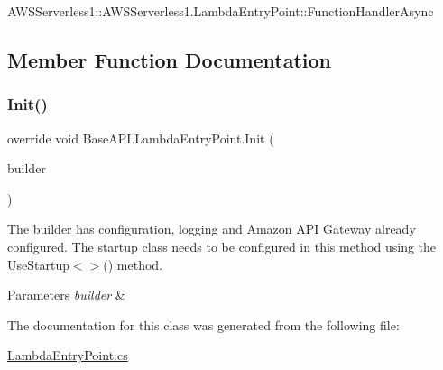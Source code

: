 A\+W\+S\+Serverless1\+::\+A\+W\+S\+Serverless1.\+Lambda\+Entry\+Point\+::\+Function\+Handler\+Async 

\subsection{Member Function Documentation}
\mbox{\label{class_base_a_p_i_1_1_lambda_entry_point_ab44b2c69e3b814fb3cf39f0e0b331514}} 
\subsubsection{\texorpdfstring{Init()}{Init()}}
{\footnotesize\ttfamily override void Base\+A\+P\+I.\+Lambda\+Entry\+Point.\+Init (\begin{DoxyParamCaption}\item[{I\+Web\+Host\+Builder}]{builder }\end{DoxyParamCaption})\hspace{0.3cm}{\ttfamily [protected]}}



The builder has configuration, logging and Amazon A\+PI Gateway already configured. The startup class needs to be configured in this method using the Use\+Startup$<$$>$() method. 


\begin{DoxyParams}{Parameters}
{\em builder} & \\
\hline
\end{DoxyParams}


The documentation for this class was generated from the following file\+:\begin{DoxyCompactItemize}
\item 
\mbox{\hyperlink{_lambda_entry_point_8cs}{Lambda\+Entry\+Point.\+cs}}\end{DoxyCompactItemize}
